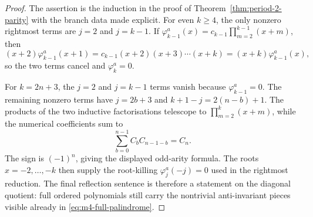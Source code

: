 \begin{proof}
The assertion is the induction in the proof of
Theorem~\ref{thm:period-2-parity} with the branch data made explicit.
For even \(k\ge4\), the only nonzero rightmost terms are \(j=2\) and
\(j=k-1\).  If
\(\varphi_{k-1}^a(x)=c_{k-1}\prod_{m=2}^{k-1}(x+m)\), then
\[
(x+2)\varphi_{k-1}^a(x+1)
=c_{k-1}(x+2)(x+3)\cdots(x+k)
=(x+k)\varphi_{k-1}^a(x),
\]
so the two terms cancel and \(\varphi_k^a=0\).

For \(k=2n+3\), the \(j=2\) and \(j=k-1\) terms vanish because
\(\varphi_{k-1}^a=0\).  The remaining nonzero terms have
\(j=2b+3\) and \(k+1-j=2(n-b)+1\).  The products of the two
inductive factorisations telescope to
\(\prod_{m=2}^{k}(x+m)\), while the numerical coefficients sum to
\[
\sum_{b=0}^{n-1}C_bC_{n-1-b}=C_n .
\]
The sign is \((-1)^n\), giving the displayed odd-arity formula.  The
roots \(x=-2,\ldots,-k\) then supply the root-killing
\(\varphi_j^a(-j)=0\) used in the rightmost reduction.  The final
reflection sentence is therefore a statement on the diagonal quotient:
full ordered polynomials still carry the nontrivial anti-invariant
pieces visible already in \eqref{eq:m4-full-palindrome}.
\end{proof}

